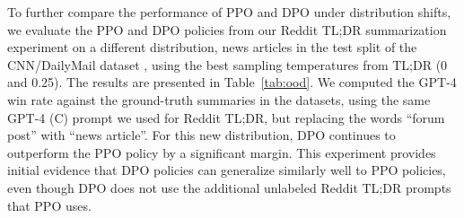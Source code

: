 To further compare the performance of PPO and DPO under distribution shifts, we evaluate the PPO and DPO policies from our Reddit TL;DR summarization experiment on a different distribution, news articles in the test split of the CNN/DailyMail dataset \citep{nallapati-etal-2016-abstractive}, using the best sampling temperatures from TL;DR (0 and 0.25). The results are presented in Table~\ref{tab:ood}. We computed the GPT-4 win rate against the ground-truth summaries in the datasets, using the same GPT-4 (C) prompt we used for Reddit TL;DR, but replacing the words ``forum post'' with ``news article''. For this new distribution, DPO continues to outperform the PPO policy by a significant margin. This experiment provides initial evidence that DPO policies can generalize similarly well to PPO policies, even though DPO does not use the additional unlabeled Reddit TL;DR prompts that PPO uses.

